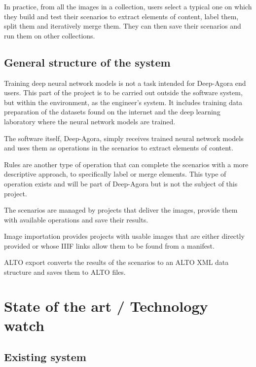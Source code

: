 \documentclass{polytech/polytech}
\numberwithin{figure}{chapter}
\begin{document}
In practice, from all the images in a collection, users select a typical one on which they build and test their scenarios to extract elements of content, label them, split them and iteratively merge them.
They can then save their scenarios and run them on other collections.
\\
\label{diagUC}

\section{General structure of the system}

Training deep neural network models is not a task intended for Deep-Agora end users.
This part of the project is to be carried out outside the software system, but within the environment, as the engineer's system.
It includes training data preparation of the datasets found on the internet and the deep learning laboratory where the neural network models are trained.

The software itself, Deep-Agora, simply receives trained neural network models and uses them as operations in the scenarios to extract elements of content.

Rules are another type of operation that can complete the scenarios with a more descriptive approach, to specifically label or merge elements.
This type of operation exists and will be part of Deep-Agora but is not the subject of this project.

The scenarios are managed by projects that deliver the images, provide them with available operations and save their results.

Image importation provides projects with usable images that are either directly provided or whose IIIF links allow them to be found from a manifest.

ALTO export converts the results of the scenarios to an ALTO XML data structure and saves them to ALTO files.

\label{diagComp}



\chapter{State of the art / Technology watch}


\section{Existing system}
\end{document}
